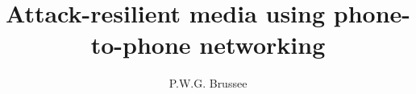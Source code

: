 \documentclass[whitelogo]{tudelft-report}
\begin{document}
\frontmatter

\title[tudelft-white]{Attack-resilient media using phone-to-phone networking}
\author[tudelft-white]{P.W.G. Brussee}

%




%
%

\tableofcontents

\mainmatter

%










\appendix

%


	
\end{document}
